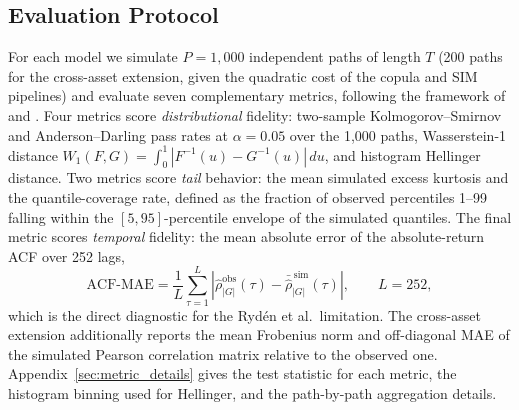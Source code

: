 \subsection{Evaluation Protocol}
\label{sec:metrics}

For each model we simulate $P = 1{,}000$ independent paths of length $T$ (200 paths for the cross-asset extension, given the quadratic cost of the copula and SIM pipelines) and evaluate seven complementary metrics, following the framework of \cite{stenger2024thinking} and \cite{alswaidan2026hybrid}.
Four metrics score \emph{distributional} fidelity: two-sample Kolmogorov--Smirnov \cite{kolmogorov1933, smirnov1948} and Anderson--Darling pass rates at $\alpha = 0.05$ over the 1{,}000 paths, Wasserstein-1 distance $W_1(F, G) = \int_0^1 |F^{-1}(u) - G^{-1}(u)|\, du$, and histogram Hellinger distance.
Two metrics score \emph{tail} behavior: the mean simulated excess kurtosis and the quantile-coverage rate, defined as the fraction of observed percentiles 1--99 falling within the $[5, 95]$-percentile envelope of the simulated quantiles.
The final metric scores \emph{temporal} fidelity: the mean absolute error of the absolute-return ACF over 252 lags,
\begin{equation}
    \text{ACF-MAE} = \frac{1}{L}\sum_{\tau=1}^{L} \left| \hat\rho^{\text{obs}}_{|G|}(\tau) - \bar{\hat\rho}^{\,\text{sim}}_{|G|}(\tau) \right|,
    \qquad L = 252,
    \label{eq:acf_mae}
\end{equation}
which is the direct diagnostic for the Ryd\'{e}n et al.\ limitation.
The cross-asset extension additionally reports the mean Frobenius norm and off-diagonal MAE of the simulated Pearson correlation matrix relative to the observed one.
Appendix~\ref{sec:metric_details} gives the test statistic for each metric, the histogram binning used for Hellinger, and the path-by-path aggregation details.

